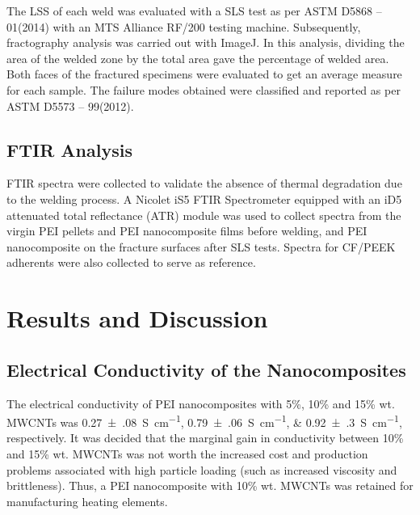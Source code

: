 The LSS of each weld was evaluated with a SLS test as per ASTM D5868 – 01(2014) with an MTS Alliance RF/200 testing machine. 
Subsequently, fractography analysis was carried out with ImageJ. 
In this analysis, dividing the area of the welded zone by the total area gave the percentage of welded area. 
Both faces of the fractured specimens were evaluated to get an average measure for each sample. 
The failure modes obtained were classified and reported as per ASTM D5573 – 99(2012). 

\subsection{FTIR Analysis}

FTIR spectra were collected to validate the absence of thermal degradation due to the welding process. 
A Nicolet iS5 FTIR Spectrometer equipped with an iD5 attenuated total reflectance (ATR) module was used to collect spectra from the virgin PEI pellets and PEI nanocomposite films before welding, and PEI nanocomposite on the fracture surfaces after SLS tests. 
Spectra for CF/PEEK adherents were also collected to serve as reference.  

\section{Results and Discussion}

\subsection{Electrical Conductivity of the Nanocomposites}

The electrical conductivity of PEI nanocomposites with 5\%, 10\% and 15\% wt. MWCNTs was \SIlist[multi-part-units = single]{0.27(08);0.79(06);0.92(30)}{\siemens\per\cm}, respectively. 
It was decided that the marginal gain in conductivity between 10\% and 15\% wt. MWCNTs was not worth the increased cost and production problems associated with high particle loading (such as increased viscosity and brittleness). 
Thus, a PEI nanocomposite with 10\% wt. MWCNTs was retained for manufacturing heating elements. 

